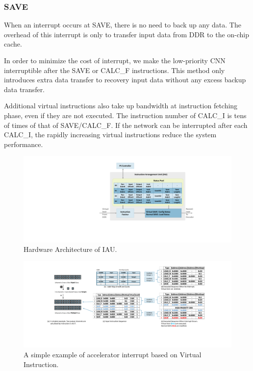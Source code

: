 \subsubsection{SAVE}
When an interrupt occurs at SAVE, there is no need to back up any data. The overhead of this interrupt is only to transfer input data from DDR to the on-chip cache. 

In order to minimize the cost of interrupt, we make the low-priority CNN interruptible after the SAVE or CALC\_F instructions. This method only introduces extra data transfer to recovery input data without any excess backup data transfer.

Additional virtual instructions also take up bandwidth at instruction fetching phase, even if they are not executed. The instruction number of CALC\_I is tens of times of that of SAVE/CALC\_F. If the network can be interrupted after each CALC\_I, the rapidly increasing virtual instructions reduce the system performance.




\begin{figure}[t]
	\centering
	\includegraphics[width=0.99\linewidth]{fig/iau.pdf}
	\caption{Hardware Architecture of IAU. 
	}
	\label{fig:IAU}
\end{figure}
\begin{figure}[t]
	\centering
	\includegraphics[width=0.95\linewidth]{fig/interexample.pdf}
	\caption{ A simple example of accelerator interrupt based on Virtual Instruction. }
	\label{fig:interexample}
\end{figure}



